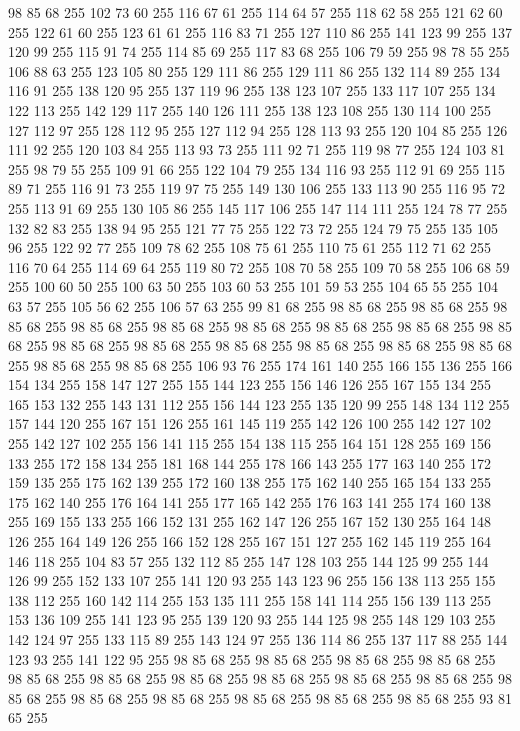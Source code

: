 98 85 68 255 102 73 60 255 116 67 61 255 114 64 57 255 118 62 58 255 121 62 60 255 122 61 60 255 123 61 61 255 116 83 71 255 127 110 86 255 141 123 99 255 137 120 99 255 115 91 74 255 114 85 69 255 117 83 68 255 106 79 59 255 98 78 55 255 106 88 63 255 123 105 80 255 129 111 86 255 129 111 86 255 132 114 89 255 134 116 91 255 138 120 95 255 137 119 96 255 138 123 107 255 133 117 107 255 134 122 113 255 142 129 117 255 140 126 111 255 138 123 108 255 130 114 100 255 127 112 97 255 128 112 95 255 127 112 94 255 128 113 93 255 120 104 85 255 126 111 92 255 120 103 84 255 113 93 73 255 111 92 71 255 119 98 77 255 124 103 81 255 98 79 55 255 109 91 66 255 122 104 79 255 134 116 93 255 112 91 69 255 115 89 71 255 116 91 73 255 119 97 75 255 149 130 106 255 133 113 90 255 116 95 72 255 113 91 69 255 130 105 86 255 145 117 106 255 147 114 111 255 124 78 77 255 132 82 83 255 138 94 95 255 121 77 75 255 122 73 72 255 124 79 75 255
135 105 96 255 122 92 77 255 109 78 62 255 108 75 61 255 110 75 61 255 112 71 62 255 116 70 64 255 114 69 64 255 119 80 72 255 108 70 58 255 109 70 58 255 106 68 59 255 100 60 50 255 100 63 50 255 103 60 53 255 101 59 53 255 104 65 55 255 104 63 57 255 105 56 62 255 106 57 63 255 99 81 68 255 98 85 68 255 98 85 68 255 98 85 68 255 98 85 68 255 98 85 68 255 98 85 68 255 98 85 68 255 98 85 68 255 98 85 68 255 98 85 68 255 98 85 68 255 98 85 68 255 98 85 68 255 98 85 68 255 98 85 68 255 98 85 68 255 98 85 68 255 106 93 76 255 174 161 140 255 166 155 136 255 166 154 134 255 158 147 127 255 155 144 123 255 156 146 126 255 167 155 134 255 165 153 132 255 143 131 112 255 156 144 123 255 135 120 99 255 148 134 112 255 157 144 120 255 167 151 126 255 161 145 119 255 142 126 100 255 142 127 102 255 142 127 102 255 156 141 115 255 154 138 115 255 164 151 128 255 169 156 133 255 172 158 134 255 181 168 144 255 178 166 143 255
177 163 140 255 172 159 135 255 175 162 139 255 172 160 138 255 175 162 140 255 165 154 133 255 175 162 140 255 176 164 141 255 177 165 142 255 176 163 141 255 174 160 138 255 169 155 133 255 166 152 131 255 162 147 126 255 167 152 130 255 164 148 126 255 164 149 126 255 166 152 128 255 167 151 127 255 162 145 119 255 164 146 118 255 104 83 57 255 132 112 85 255 147 128 103 255 144 125 99 255 144 126 99 255 152 133 107 255 141 120 93 255 143 123 96 255 156 138 113 255 155 138 112 255 160 142 114 255 153 135 111 255 158 141 114 255 156 139 113 255 153 136 109 255 141 123 95 255 139 120 93 255 144 125 98 255 148 129 103 255 142 124 97 255 133 115 89 255 143 124 97 255 136 114 86 255 137 117 88 255 144 123 93 255 141 122 95 255 98 85 68 255 98 85 68 255 98 85 68 255 98 85 68 255 98 85 68 255 98 85 68 255 98 85 68 255 98 85 68 255 98 85 68 255 98 85 68 255 98 85 68 255 98 85 68 255 98 85 68 255 98 85 68 255 98 85 68 255 98 85 68 255 93 81 65 255
